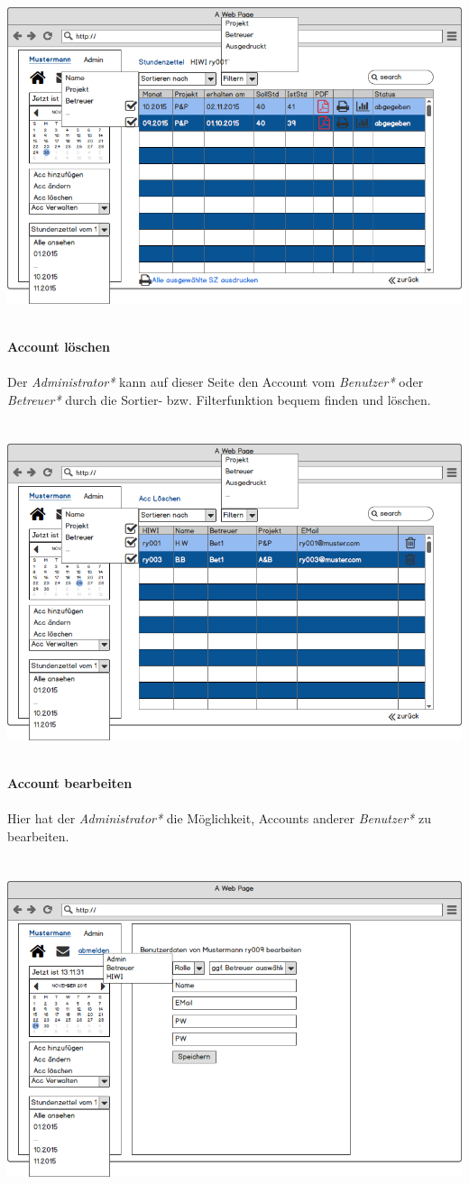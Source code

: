 \includegraphics[width=\linewidth]{UI/Admin/EinBenutzer.png}

\newpage
\textbf{\\Account löschen}\\
\\
Der \emph{Administrator*} kann auf dieser Seite den Account vom \emph{Benutzer*} oder \emph{Betreuer*} durch die Sortier- bzw. Filterfunktion bequem finden und löschen.\\
\\
\\
\includegraphics[width=\linewidth]{UI/Admin/Accounts/Ubersicht.png}



\newpage
\textbf{\\Account bearbeiten}\\
\\
Hier hat der \emph{Administrator*} die Möglichkeit, Accounts anderer \emph{Benutzer*} zu bearbeiten.\\
\\
\\
\includegraphics[width=\linewidth]{UI/Admin/Accounts/Bearbeiten.png}
